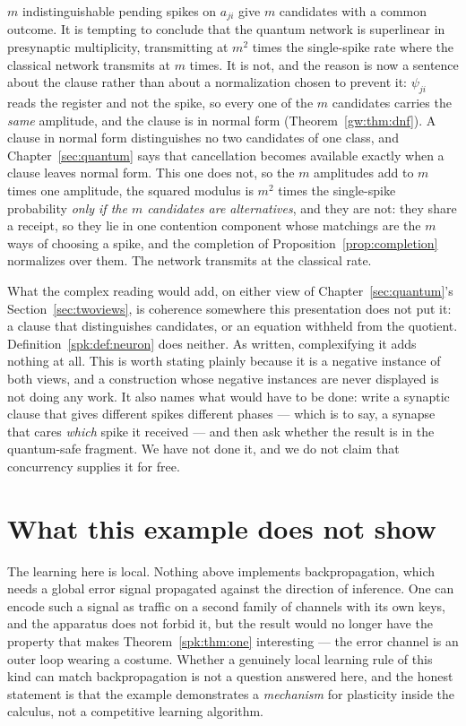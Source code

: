 \begin{remark}
\label{spk:rmk:bosonic}
$m$ indistinguishable pending spikes on $a_{ji}$ give $m$ candidates with a common
outcome. It is tempting to conclude that the quantum network is superlinear in
presynaptic multiplicity, transmitting at $m^2$ times the single-spike rate where the
classical network transmits at $m$ times. It is not, and the reason is now a sentence
about the clause rather than about a normalization chosen to prevent it: $\psi_{ji}$
reads the register and not the spike, so every one of the $m$ candidates carries the
\emph{same} amplitude, and the clause is in normal form (Theorem~\ref{gw:thm:dnf}). A
clause in normal form distinguishes no two candidates of one class, and
Chapter~\ref{sec:quantum} says that cancellation becomes available exactly when a clause
leaves normal form. This one does not, so the $m$ amplitudes add to $m$ times one
amplitude, the squared modulus is $m^2$ times the single-spike probability \emph{only if
the $m$ candidates are alternatives}, and they are not: they share a receipt, so they
lie in one contention component whose matchings are the $m$ ways of choosing a spike,
and the completion of Proposition~\ref{prop:completion} normalizes over them. The network
transmits at the classical rate.

What the complex reading would add, on either view of Chapter~\ref{sec:quantum}'s
Section~\ref{sec:twoviews}, is coherence somewhere this presentation does not put it: a
clause that distinguishes candidates, or an equation withheld from the quotient.
Definition~\ref{spk:def:neuron} does neither. As written, complexifying it adds nothing
at all. This is worth stating plainly because it is a negative instance of both views,
and a construction whose negative instances are never displayed is not doing any work.
It also names what would have to be done: write a synaptic clause that gives different
spikes different phases --- which is to say, a synapse that cares \emph{which} spike it
received --- and then ask whether the result is in the quantum-safe fragment. We have not
done it, and we do not claim that concurrency supplies it for free.
\end{remark}

\section{What this example does not show}

The learning here is local. Nothing above implements backpropagation, which needs a
global error signal propagated against the direction of inference. One can encode such a
signal as traffic on a second family of channels with its own keys, and the apparatus does
not forbid it, but the result would no longer have the property that makes
Theorem~\ref{spk:thm:one} interesting --- the error channel is an outer loop wearing a
costume. Whether a genuinely local learning rule of this kind can match backpropagation is
not a question answered here, and the honest statement is that the example demonstrates a
\emph{mechanism} for plasticity inside the calculus, not a competitive learning algorithm.

